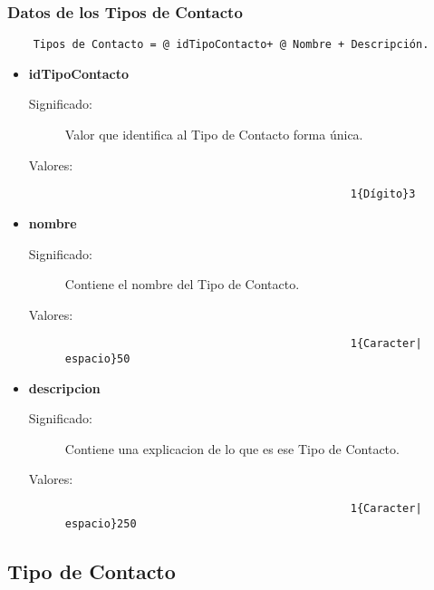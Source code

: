 \subsubsection{Datos de los Tipos de Contacto}
\begin{lstlisting}
	Tipos de Contacto = @ idTipoContacto+ @ Nombre + Descripción.
\end{lstlisting}
\begin{itemize}
	\item	\textbf{idTipoContacto}
		\begin{description}
			\item [Significado:] Valor que identifica al Tipo de Contacto forma única.
			\item [Valores:]{\begin{lstlisting}
                                            1{Dígito}3
                                         \end{lstlisting}}
		\end{description}
	
        \item \textbf{nombre}
		\begin{description}
			\item [Significado:] Contiene el nombre del Tipo de Contacto.
			\item [Valores:]{\begin{lstlisting}
                                            1{Caracter| espacio}50
                                         \end{lstlisting}} 
		\end{description}

        \item \textbf{descripcion}
		\begin{description}
			\item [Significado:] Contiene una explicacion de lo que es ese Tipo de Contacto.
			\item [Valores:]{\begin{lstlisting}
                                            1{Caracter| espacio}250
                                         \end{lstlisting}} 
		\end{description}
\end{itemize}


\subsection{Tipo de Contacto}\label{dd:TipoContacto}
